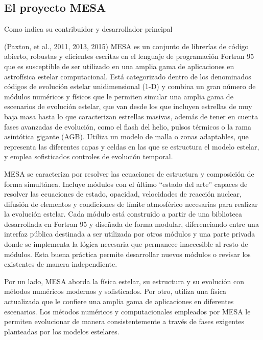 \subsection{El proyecto MESA}
Como indica su contribuidor y desarrollador principal \author{QUEPONERAQUÍ??} \cite[xxxxxx]{Pasetto2014} (Paxton, et al., 2011, 2013, 2015) MESA es un conjunto de librerías de código abierto, robustas y eficientes escritas en el lenguaje de programación Fortran 95 que es susceptible de ser utilizado en una amplia gama de aplicaciones en astrofísica estelar computacional. Está categorizado dentro de los denominados códigos de evolución estelar unidimensional (1-D) y combina un gran número de módulos numéricos y físicos que le permiten simular una amplia gama de escenarios de evolución estelar, que van desde los que incluyen estrellas de muy baja masa hasta lo que caracterizan estrellas masivas, además de tener en cuenta fases avanzadas de evolución, como el flash del helio, pulsos térmicos o la rama asintótica gigante (AGB). Utiliza un modelo de malla o zonas adaptables, que representa las diferentes capas y celdas en las que se estructura el modelo estelar, y emplea sofisticados controles de evolución temporal.\par

MESA se caracteriza por resolver las ecuaciones de estructura y composición de forma simultánea. Incluye módulos con el último “estado del arte” capaces de resolver las ecuaciones de estado, opacidad, velocidades de reacción nuclear, difusión de elementos y condiciones de límite atmosférico necesarias para realizar la evolución estelar. Cada módulo está construido a partir de una biblioteca desarrollada en Fortran 95 y diseñada de forma modular, diferenciando entre una interfaz pública destinada a ser utilizada por otros módulos y una parte privada donde se implementa la lógica necesaria que permanece inaccesible al resto de módulos. Esta buena práctica permite desarrollar nuevos módulos o revisar los existentes de manera independiente.\par

Por un lado, MESA aborda la física estelar, su estructura y su evolución con métodos numéricos modernos y sofisticados. Por otro, utiliza una física actualizada que le confiere una amplia gama de aplicaciones en diferentes escenarios. Los métodos numéricos y computacionales empleados por MESA le permiten evolucionar de manera consistentemente a través de fases exigentes planteadas por los modelos estelares.\par

